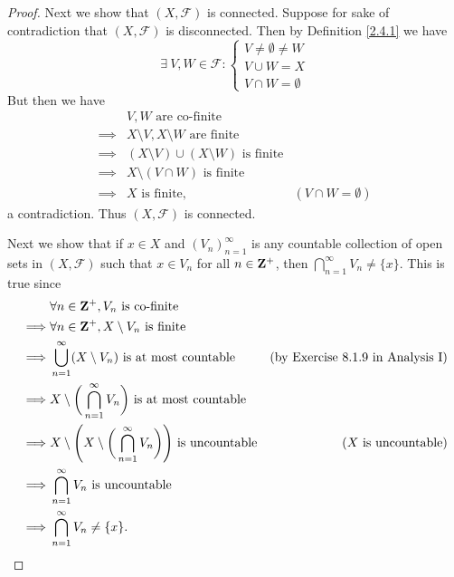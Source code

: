 \begin{proof}
    Next we show that \((X, \mathcal{F})\) is connected.
    Suppose for sake of contradiction that \((X, \mathcal{F})\) is disconnected.
    Then by Definition \ref{2.4.1} we have
    \[
        \exists\ V, W \in \mathcal{F} : \begin{cases}
            V \neq \emptyset \neq W \\
            V \cup W = X            \\
            V \cap W = \emptyset
        \end{cases}
    \]
    But then we have
    \begin{align*}
                 & V, W \text{ are co-finite}                                                      \\
        \implies & X \setminus V, X \setminus W \text{ are finite}                                 \\
        \implies & (X \setminus V) \cup (X \setminus W) \text{ is finite}                          \\
        \implies & X \setminus (V \cap W) \text{ is finite}                                        \\
        \implies & X \text{ is finite},                                   & (V \cap W = \emptyset)
    \end{align*}
    a contradiction.
    Thus \((X, \mathcal{F})\) is connected.

    Next we show that if \(x \in X\) and \((V_n)_{n = 1}^\infty\) is any countable collection of open sets in \((X, \mathcal{F})\) such that \(x \in V_n\) for all \(n \in \mathbf{Z}^+\), then \(\bigcap_{n = 1}^\infty V_n \neq \{x\}\).
    This is true since
    \begin{align*}
                 & \forall n \in \mathbf{Z}^+, V_n \text{ is co-finite}                                                                                                 \\
        \implies & \forall n \in \mathbf{Z}^+, X \setminus V_n \text{ is finite}                                                                                        \\
        \implies & \bigcup_{n = 1}^\infty (X \setminus V_n) \text{ is at most countable}                             & \text{(by Exercise 8.1.9 in Analysis I)} \\
        \implies & X \setminus \bigg(\bigcap_{n = 1}^\infty V_n\bigg) \text{ is at most countable}                                                              \\
        \implies & X \setminus \Bigg(X \setminus \bigg(\bigcap_{n = 1}^\infty V_n\bigg)\Bigg) \text{ is uncountable} & \text{(\(X\) is uncountable)}            \\
        \implies & \bigcap_{n = 1}^\infty V_n \text{ is uncountable}                                                                                            \\
        \implies & \bigcap_{n = 1}^\infty V_n \neq \{x\}.
    \end{align*}


\end{proof}
